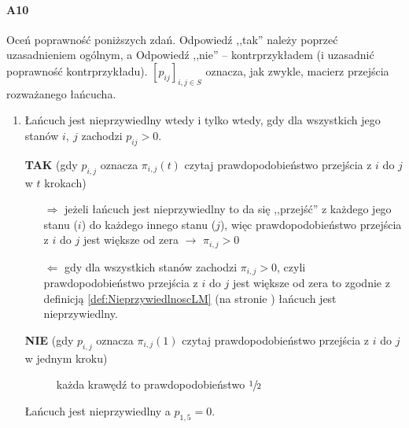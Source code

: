 \paragraph{A10} Oceń poprawność poniższych zdań. Odpowiedź ,,tak” należy poprzeć uzasadnieniem ogólnym, a Odpowiedź ,,nie” – kontrprzykładem (i uzasadnić poprawność kontrprzykładu). $\left[ p_{ij} \right]_{i,j\in S}$ oznacza, jak zwykle, macierz przejścia rozważanego łańcucha.
\begin{enumerate}[label=\alph*)]
\item Łańcuch jest nieprzywiedlny wtedy i tylko wtedy, gdy dla wszystkich jego stanów $i,\ j$ zachodzi $p_{ij} > 0$.

\textbf{TAK} (gdy $p_{i,j}$ oznacza $\pi_{i,j}(t)$ czytaj prawdopodobieństwo przejścia z $i$ do $j$ w $t$ krokach)
\begin{itemize}
\item[$\Rightarrow$] jeżeli łańcuch jest nieprzywiedlny to  da się ,,przejść'' z każdego jego stanu ($i$) do każdego innego stanu ($j$), więc prawdopodobieństwo przejścia z $i$ do $j$ jest większe od zera $\rightarrow$ $\pi _{i,j} > 0$
\item[$\Leftarrow$] gdy dla wszystkich stanów zachodzi $\pi _{i,j} > 0$, czyli  prawdopodobieństwo przejścia z $i$ do $j$ jest większe od zera to zgodnie z definicją \ref{def:NieprzywiedlnoscLM} (na stronie \pageref{def:NieprzywiedlnoscLM}) łańcuch jest nieprzywiedlny. 
\end{itemize}
\textbf{NIE} (gdy $p_{i,j}$ oznacza $\pi_{i,j}(1)$ czytaj prawdopodobieństwo przejścia z $i$ do $j$ w jednym kroku)
\begin{figure}[H]
\centering
{}
\caption*{każda krawędź to prawdopodobieństwo $\sfrac{1}{2}$}
\end{figure}
Łańcuch jest nieprzywiedlny a $p_{1,5}=0$.


\end{enumerate}
